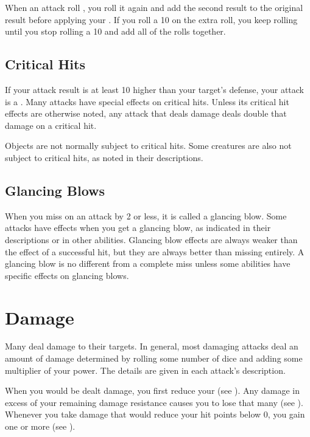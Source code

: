         When an attack roll , you roll it again and add the second result to the original result before applying your .
        If you roll a 10 on the extra roll, you keep rolling until you stop rolling a 10 and add all of the rolls together.

    \subsection{Critical Hits}\label{Critical Hits}
        If your attack result is at least 10 higher than your target's defense, your attack is a .
        Many attacks have special effects on critical hits.
        Unless its critical hit effects are otherwise noted, any attack that deals damage deals double that damage on a critical hit.

        Objects are not normally subject to critical hits.
        Some creatures are also not subject to critical hits, as noted in their descriptions.

    \subsection{Glancing Blows}\label{Glancing Blows}
        When you miss on an attack by 2 or less, it is called a glancing blow.
        Some attacks have effects when you get a glancing blow, as indicated in their descriptions or in other abilities.
        Glancing blow effects are always weaker than the effect of a successful hit, but they are always better than missing entirely.
        A glancing blow is no different from a complete miss unless some abilities have specific effects on glancing blows.

\section{Damage}\label{Damage}
    Many  deal damage to their targets.
    In general, most damaging attacks deal an amount of damage determined by rolling some number of dice and adding some multiplier of your power.
    The details are given in each attack's description.

    When you would be dealt damage, you first reduce your  (see ).
    Any damage in excess of your remaining damage resistance causes you to lose that many  (see ).
    Whenever you take damage that would reduce your hit points below 0, you gain one or more  (see ).

